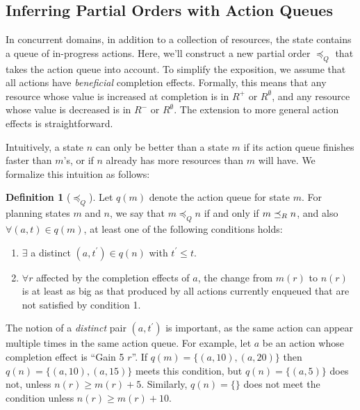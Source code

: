 \documentclass[letterpaper]{article}
\theoremstyle{plain} \newtheorem{theorem}{Theorem} \newtheorem{proposition}{Proposition} \newtheorem{lemma}{Lemma}
\theoremstyle{definition} \newtheorem{definition}{Definition} \newtheorem{conjecture}{Conjecture} \newtheorem*{example}{Example}
\theoremstyle{remark} \newtheorem*{remark}{Remark} \newtheorem*{note}{Note} \newtheorem{case}{Case}
\begin{document}
\subsection{Inferring Partial Orders with Action Queues}

\newcommand{\poq}{\preceq_Q}

In concurrent domains, in addition to a collection of resources, the state contains a queue
of in-progress actions. Here, we'll construct a new partial order $\poq$ that takes the
action queue into account. To simplify the exposition, we assume that all
actions have \emph{beneficial} completion effects.
Formally, this means that any resource whose value is
increased at completion is in $R^+$ or $R^\emptyset$, and any resource whose value is decreased is in
$R^-$ or $R^\emptyset$. The extension to more general action effects is straightforward.

Intuitively, a state $n$ can only be better than a state $m$ if
its action queue finishes faster than $m$'s, or if $n$ already
has more resources than $m$ will have. We formalize this
intuition as follows:

\begin{definition}[$\poq$]
	\label{def-poq}
	Let $q(m)$ denote the action queue for state $m$. For
  planning states $m$ and $n$, we say that $m \poq n$ if and
  only if $m \preceq_R n$, and also $\forall (a, t) \in q(m)$, at least one of the following conditions holds:
	\begin{enumerate}
		\item $\exists$ a distinct $ (a, t^\prime) \in q(n)$ with $t^\prime \le t$.
		\item $\forall r $ affected by the completion effects of $
      a$, the change from $m(r)$ to $n(r)$ is at least as big
      as that produced by all actions currently enqueued that
      are not satisfied by condition 1.
	\end{enumerate}
\end{definition}
The notion of a \emph{distinct} pair $(a, t^\prime)$ is important, as the same action can appear multiple times in the same action queue. For example, let $a$ be an action whose completion effect is ``Gain 5 $r$''. If $q(m) = \{(a, 10), (a, 20)\}$ then $q(n) = \{(a, 10),
(a, 15)\}$ meets this condition, but $q(n) = \{(a, 5)\}$ does not, unless $n(r) \ge m(r) + 5$. Similarly, $q(n) = \{\}$ does not meet the condition unless $n(r) \ge m(r) + 10$.
\end{document}

